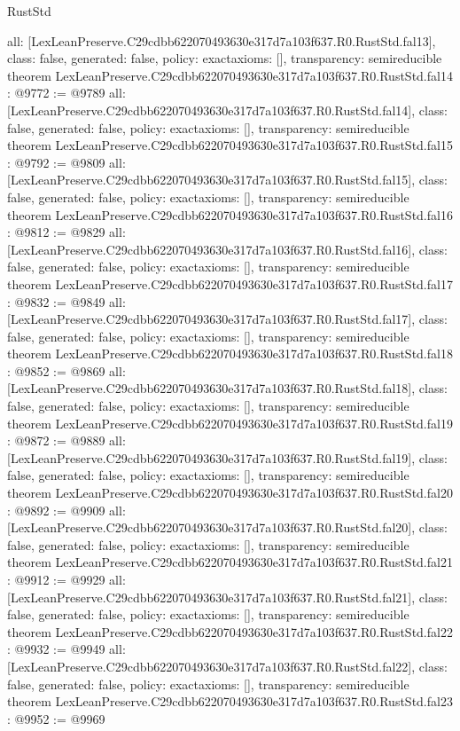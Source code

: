 \begin{lexlean}{RustStd}
\begin{coremodule}
{  all: [LexLeanPreserve.C29cdbb622070493630e317d7a103f637.R0.RustStd.fal13],
  class: false,
  generated: false,
  policy: exact{axioms: []},
  transparency: semireducible
}
theorem LexLeanPreserve.C29cdbb622070493630e317d7a103f637.R0.RustStd.fal14 : @9772 := @9789 {
  all: [LexLeanPreserve.C29cdbb622070493630e317d7a103f637.R0.RustStd.fal14],
  class: false,
  generated: false,
  policy: exact{axioms: []},
  transparency: semireducible
}
theorem LexLeanPreserve.C29cdbb622070493630e317d7a103f637.R0.RustStd.fal15 : @9792 := @9809 {
  all: [LexLeanPreserve.C29cdbb622070493630e317d7a103f637.R0.RustStd.fal15],
  class: false,
  generated: false,
  policy: exact{axioms: []},
  transparency: semireducible
}
theorem LexLeanPreserve.C29cdbb622070493630e317d7a103f637.R0.RustStd.fal16 : @9812 := @9829 {
  all: [LexLeanPreserve.C29cdbb622070493630e317d7a103f637.R0.RustStd.fal16],
  class: false,
  generated: false,
  policy: exact{axioms: []},
  transparency: semireducible
}
theorem LexLeanPreserve.C29cdbb622070493630e317d7a103f637.R0.RustStd.fal17 : @9832 := @9849 {
  all: [LexLeanPreserve.C29cdbb622070493630e317d7a103f637.R0.RustStd.fal17],
  class: false,
  generated: false,
  policy: exact{axioms: []},
  transparency: semireducible
}
theorem LexLeanPreserve.C29cdbb622070493630e317d7a103f637.R0.RustStd.fal18 : @9852 := @9869 {
  all: [LexLeanPreserve.C29cdbb622070493630e317d7a103f637.R0.RustStd.fal18],
  class: false,
  generated: false,
  policy: exact{axioms: []},
  transparency: semireducible
}
theorem LexLeanPreserve.C29cdbb622070493630e317d7a103f637.R0.RustStd.fal19 : @9872 := @9889 {
  all: [LexLeanPreserve.C29cdbb622070493630e317d7a103f637.R0.RustStd.fal19],
  class: false,
  generated: false,
  policy: exact{axioms: []},
  transparency: semireducible
}
theorem LexLeanPreserve.C29cdbb622070493630e317d7a103f637.R0.RustStd.fal20 : @9892 := @9909 {
  all: [LexLeanPreserve.C29cdbb622070493630e317d7a103f637.R0.RustStd.fal20],
  class: false,
  generated: false,
  policy: exact{axioms: []},
  transparency: semireducible
}
theorem LexLeanPreserve.C29cdbb622070493630e317d7a103f637.R0.RustStd.fal21 : @9912 := @9929 {
  all: [LexLeanPreserve.C29cdbb622070493630e317d7a103f637.R0.RustStd.fal21],
  class: false,
  generated: false,
  policy: exact{axioms: []},
  transparency: semireducible
}
theorem LexLeanPreserve.C29cdbb622070493630e317d7a103f637.R0.RustStd.fal22 : @9932 := @9949 {
  all: [LexLeanPreserve.C29cdbb622070493630e317d7a103f637.R0.RustStd.fal22],
  class: false,
  generated: false,
  policy: exact{axioms: []},
  transparency: semireducible
}
theorem LexLeanPreserve.C29cdbb622070493630e317d7a103f637.R0.RustStd.fal23 : @9952 := @9969 {
}
\end{coremodule}
\end{lexlean}
